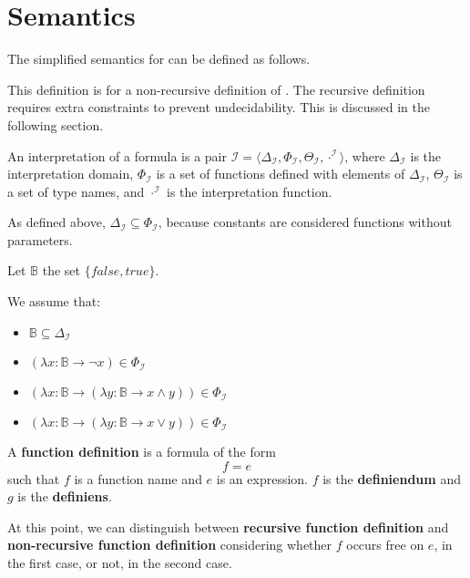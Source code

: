 \section{Semantics}

\newcommand{\I}[1]{\ensuremath{{#1}^{\mathcal{I}}}}

\newcommand{\DeltaI}{\ensuremath{\Delta _{\mathcal{I}}}}
\newcommand{\ThetaI}{\ensuremath{\Theta _{\mathcal{I}}}}
\newcommand{\PhiI}{\ensuremath{\Phi _{\mathcal{I}}}}

\newcommand{\lambd}[2]{\ensuremath{(\lambda {#1} \to {#2})}}

The simplified semantics for \Soda can be defined as follows.

This definition is for a non-recursive definition of \Soda.
The recursive definition requires extra constraints to prevent undecidability.
This is discussed in the following section.

An interpretation of a \Soda formula is a pair $\mathcal{I} = \langle \DeltaI, \PhiI, \ThetaI, \I{\cdot} \rangle$, where $\DeltaI$ is the interpretation domain, $\PhiI$ is a set of functions defined with elements of $\DeltaI$, $\ThetaI$ is a set of type names, and $\I{\cdot}$ is the interpretation function.

As defined above, $\DeltaI \subseteq \PhiI$, because constants are considered functions without parameters.

Let $\mathbb{B}$ the set $\{false, true\}$.

We assume that:
\begin{itemize}
    \item $\mathbb{B} \subseteq \DeltaI$
    \item $\lambd{x: \mathbb{B}}{\lnot x} \in \PhiI$
    \item $\lambd{x: \mathbb{B}}{\lambd{y: \mathbb{B}}{x \land y}} \in \PhiI$
    \item $\lambd{x: \mathbb{B}}{\lambd{y: \mathbb{B}}{x \lor y}} \in \PhiI$
\end{itemize}

A \textbf{function definition} is a formula of the form
\[f = e\]
such that $f$ is a function name and $e$ is an expression.
$f$ is the \textbf{definiendum} and $g$ is the \textbf{definiens}.


At this point, we can distinguish between \textbf{recursive function definition} and \textbf{non-recursive function definition} considering whether $f$ occurs free on $e$, in the first case, or not, in the second case.

